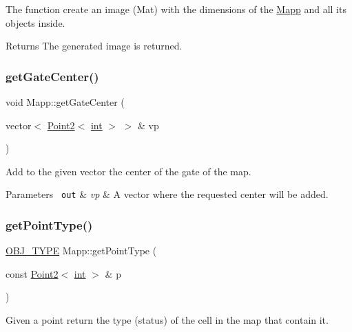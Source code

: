 The function create an image (Mat) with the dimensions of the \mbox{\hyperlink{class_mapp}{Mapp}} and all its objects inside. 

\begin{DoxyReturn}{Returns}
The generated image is returned. 
\end{DoxyReturn}
\mbox{\label{class_mapp_a7b17d1a5e8567021465397088e1dea8d}} 
\subsubsection{\texorpdfstring{getGateCenter()}{getGateCenter()}}
{\footnotesize\ttfamily void Mapp\+::get\+Gate\+Center (\begin{DoxyParamCaption}\item[{vector$<$ \mbox{\hyperlink{class_point2}{Point2}}$<$ \mbox{\hyperlink{draw_8hh_aa620a13339ac3a1177c86edc549fda9b}{int}} $>$ $>$ \&}]{vp }\end{DoxyParamCaption})}



Add to the given vector the center of the gate of the map. 


\begin{DoxyParams}[1]{Parameters}
\mbox{\texttt{ out}}  & {\em vp} & A vector where the requested center will be added. \\
\hline
\end{DoxyParams}
\mbox{\label{class_mapp_ac6341641bd67502eef7c025cb4cd1c71}} 
\subsubsection{\texorpdfstring{getPointType()}{getPointType()}}
{\footnotesize\ttfamily \mbox{\hyperlink{map_8hh_a714b9c2c276fbae637fee36453d9121e}{O\+B\+J\+\_\+\+T\+Y\+PE}} Mapp\+::get\+Point\+Type (\begin{DoxyParamCaption}\item[{const \mbox{\hyperlink{class_point2}{Point2}}$<$ \mbox{\hyperlink{draw_8hh_aa620a13339ac3a1177c86edc549fda9b}{int}} $>$ \&}]{p }\end{DoxyParamCaption})}



Given a point return the type (status) of the cell in the map that contain it. 


